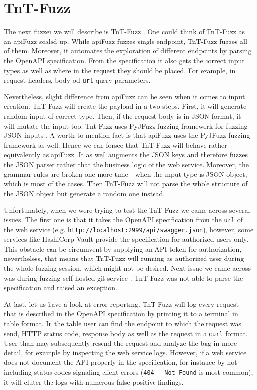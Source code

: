 \section{TnT-Fuzz}
The next fuzzer we will describe is TnT-Fuzz \cite{tntFuzzer2020github}. One could think of  TnT-Fuzz as an apiFuzz scaled up. While apiFuzz fuzzes single endpoint, TnT-Fuzz fuzzes all of them. Moreover, it automates the exploration of different endpoints by parsing the OpenAPI specification. From the specification it also gets the correct input types as well as where in the request they should be placed. For example, in request headers, body od \texttt{url} query parameters.

Nevertheless, slight difference from apiFuzz can be seen when it comes to input creation. TnT-Fuzz will create the payload in a two steps. First, it will generate random input of correct type. Then, if the request body is in JSON format, it will mutate the input too. Tnt-Fuzz uses PyJFuzz fuzzing framework for fuzzing JSON inputs \cite{pyjfuzz2020github}. A worth to mention fact is that apiFuzz uses the PyJFuzz fuzzing framework as well. Hence we can forsee that TnT-Fuzz will behave rather equivalently as apiFuzz. It as well augments the JSON keys and therefore fuzzes the JSON parser rather that the business logic of the web service. Moreover, the grammar rules are broken one more time - when the input type is JSON object, which is most of the cases. Then TnT-Fuzz will not parse the whole structure of the JSON object but generate a random one instead.

Unfortunately, when we were trying to test the TnT-Fuzz we came across several issues. The first one is that it takes the OpenAPI specification from the \texttt{url} of the web service (e.g. \texttt{http://localhost:2999/api/swagger.json}), however, some services like HashiCorp Vault \cite{vault2020github} provide the specification for authorized users only. This obstacle can be circumvent by supplying an API token for authorization, nevertheless, that means that TnT-Fuzz will running as authorized user during the whole fuzzing session, which might not be desired. Next issue we came across was during fuzzing self-hosted git service \cite{gitea2020web}. TnT-Fuzz was not able to parse the specification and raised an exception.

At last, let us have a look at error reporting. TnT-Fuzz will log every request that is described in the OpenAPI specification by printing it to a terminal in table format. In the table user can find the endpoint to which the request was send, HTTP status code, response body as well as the request in a \texttt{curl} format. User than may subsequently resend the request and analyze the bug in more detail, for example by inspecting the web service logs. However, if a web service does not document the API properly in the specification, for instance by not including status codes signaling client errors (\texttt{404 - Not Found} is most common), it will cluter the logs with numerous false positive findings.


